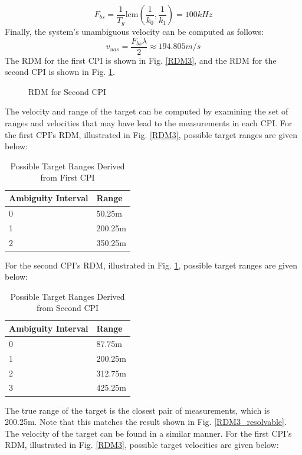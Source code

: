 \documentclass[conference]{IEEEtran}
\begin{document}
\begin{equation}
F_{bs} = \frac{1}{T_g}\text{lcm}\left(\frac{1}{k_0},\frac{1}{k_1}\right) = 100kHz
\end{equation}
Finally, the system's unambiguous velocity can be computed as follows:
\begin{equation}
v_{uas} = \frac{F_{bs}\lambda}{2} \approx 194.805m/s
\end{equation}
The RDM for the first CPI is shown in Fig. \ref{RDM3}, and the RDM for the second CPI is shown in Fig. \ref{multi_prf_rdm}.
\begin{figure}[H]
\centerline{}
\caption{RDM for Second CPI}
\label{multi_prf_rdm}
\end{figure}
\noindent
The velocity and range of the target can be computed by examining the set of ranges and velocities that may have lead to the measurements in each CPI. For the first CPI's RDM, illustrated in Fig. \ref{RDM3}, possible target ranges are given below:
\begin{table}[H]
\caption{Possible Target Ranges Derived from First CPI}
\label{Range CPI0}
\begin{tabularx}{0.5\textwidth}{| X | X |}
\hline
Ambiguity Interval & Range \\
\hline
0 & 50.25m \\
\hline
1 & 200.25m \\
\hline
2 & 350.25m \\
\hline
\end{tabularx}
\end{table}
\noindent
For the second CPI's RDM, illustrated in Fig. \ref{multi_prf_rdm}, possible target ranges are given below:
\begin{table}[H]
\caption{Possible Target Ranges Derived from Second CPI}
\label{Range CPI1}
\begin{tabularx}{0.5\textwidth}{| X | X |}
\hline
Ambiguity Interval & Range \\
\hline
0 & 87.75m \\
\hline
1 & 200.25m \\
\hline
2 & 312.75m \\
\hline
3 & 425.25m \\
\hline
\end{tabularx}
\end{table}
\noindent
The true range of the target is the closest pair of measurements, which is 200.25m. Note that this matches the result shown in Fig. \ref{RDM3_resolvable}. The velocity of the target can be found in a similar manner. For the first CPI's RDM, illustrated in Fig. \ref{RDM3}, possible target velocities are given below:
\end{document}
